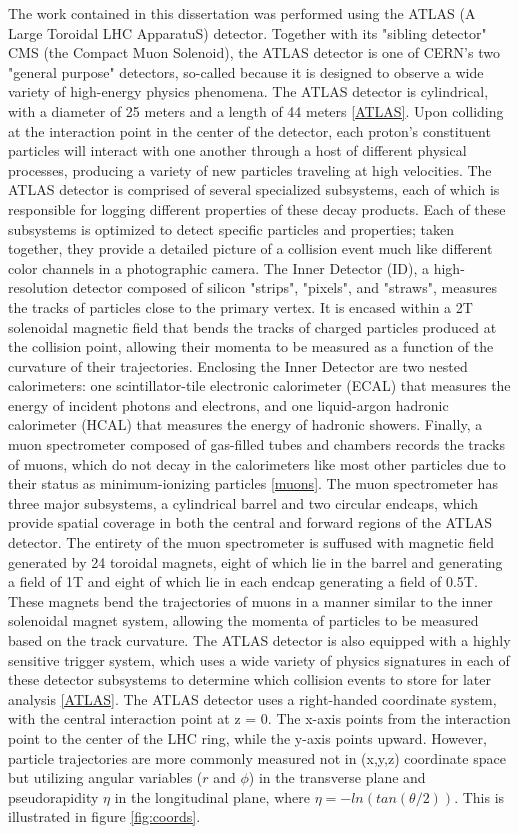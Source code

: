 The work contained in this dissertation was performed using the ATLAS (A Large Toroidal LHC ApparatuS) detector. Together with its "sibling detector" CMS (the Compact Muon Solenoid), the ATLAS detector is one of CERN's two "general purpose" detectors, so-called because it is designed to observe a wide variety of high-energy physics phenomena. The ATLAS detector is cylindrical, with a diameter of 25 meters and a length of 44 meters \ref{ATLAS}. Upon colliding at the interaction point in the center of the detector, each proton's constituent particles will interact with one another through a host of different physical processes, producing a variety of new particles traveling at high velocities. The ATLAS detector is comprised of several specialized subsystems, each of which is responsible for logging different properties of these decay products. Each of these subsystems is optimized to detect specific particles and properties; taken together, they provide a detailed picture of a collision event much like different color channels in a photographic camera.
	The Inner Detector (ID), a high-resolution detector composed of silicon "strips", "pixels", and "straws", measures the tracks of particles close to the primary vertex. It is encased within a 2T solenoidal magnetic field that bends the tracks of charged particles produced at the collision point, allowing their momenta to be measured as a function of the curvature of their trajectories. Enclosing the Inner Detector are two nested calorimeters: one scintillator-tile electronic calorimeter (ECAL) that measures the energy of incident photons and electrons, and one liquid-argon hadronic calorimeter (HCAL) that measures the energy of hadronic showers. Finally, a muon spectrometer composed of gas-filled tubes and chambers records the tracks of muons, which do not decay in the calorimeters like most other particles due to their status as minimum-ionizing particles \ref{muons}. The muon spectrometer has three major subsystems, a cylindrical barrel and two circular endcaps, which provide spatial coverage in both the central and forward regions of the ATLAS detector. The entirety of the muon spectrometer is suffused with magnetic field generated by 24 toroidal magnets, eight of which lie in the barrel and generating a field of 1T and eight of which lie in each endcap generating a field of 0.5T. These magnets bend the trajectories of muons in a manner similar to the inner solenoidal magnet system, allowing the momenta of particles to be measured based on the track curvature. The ATLAS detector is also equipped with a highly sensitive trigger system, which uses a wide variety of physics signatures in each of these detector subsystems to determine which collision events to store for later analysis \ref{ATLAS}.
	The ATLAS detector uses a right-handed coordinate system, with the central interaction point at z = 0. The x-axis points from the interaction point to the center of the LHC ring, while the y-axis points upward. However, particle trajectories are more commonly measured not in (x,y,z) coordinate space but utilizing angular variables (\(r\) and \( \phi \)) in the transverse plane and pseudorapidity \( \eta \) in the longitudinal plane, where \( \eta = -ln(tan( \theta /2) ) \). This is illustrated in figure \ref{fig:coords}.

